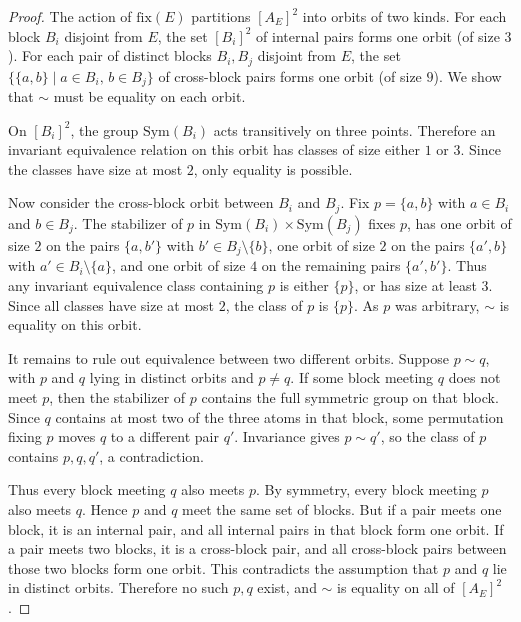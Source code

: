 \documentclass[10pt,a4paper]{amsart}
\theoremstyle{definition}
\begin{document}
\begin{proof}
The action of \(\mathrm{fix}(E)\) partitions \([A_E]^2\) into orbits of two kinds.  For each block \(B_i\) disjoint from \(E\), the set \([B_i]^2\) of internal pairs forms one orbit (of size \(3\)).  For each pair of distinct blocks \(B_i,B_j\) disjoint from \(E\), the set \(\{\{a,b\}\mid a\in B_i,\, b\in B_j\}\) of cross-block pairs forms one orbit (of size \(9\)).  We show that \(\sim\) must be equality on each orbit.

On \([B_i]^2\), the group \(\mathrm{Sym}(B_i)\) acts transitively on three points.  Therefore an invariant equivalence relation on this orbit has classes of size either \(1\) or \(3\).  Since the classes have size at most \(2\), only equality is possible.

Now consider the cross-block orbit between \(B_i\) and \(B_j\).  Fix \(p=\{a,b\}\) with \(a\in B_i\) and \(b\in B_j\).  The stabilizer of \(p\) in \(\mathrm{Sym}(B_i)\times \mathrm{Sym}(B_j)\) fixes \(p\), has one orbit of size \(2\) on the pairs \(\{a,b'\}\) with \(b'\in B_j\setminus\{b\}\), one orbit of size \(2\) on the pairs \(\{a',b\}\) with \(a'\in B_i\setminus\{a\}\), and one orbit of size \(4\) on the remaining pairs \(\{a',b'\}\).  Thus any invariant equivalence class containing \(p\) is either \(\{p\}\), or has size at least \(3\).  Since all classes have size at most \(2\), the class of \(p\) is \(\{p\}\).  As \(p\) was arbitrary, \(\sim\) is equality on this orbit.

It remains to rule out equivalence between two different orbits.  Suppose \(p\sim q\), with \(p\) and \(q\) lying in distinct orbits and \(p\neq q\).  If some block meeting \(q\) does not meet \(p\), then the stabilizer of \(p\) contains the full symmetric group on that block.  Since \(q\) contains at most two of the three atoms in that block, some permutation fixing \(p\) moves \(q\) to a different pair \(q'\).  Invariance gives \(p\sim q'\), so the class of \(p\) contains \(p,q,q'\), a contradiction.

Thus every block meeting \(q\) also meets \(p\).  By symmetry, every block meeting \(p\) also meets \(q\).  Hence \(p\) and \(q\) meet the same set of blocks.  But if a pair meets one block, it is an internal pair, and all internal pairs in that block form one orbit.  If a pair meets two blocks, it is a cross-block pair, and all cross-block pairs between those two blocks form one orbit.  This contradicts the assumption that \(p\) and \(q\) lie in distinct orbits.  Therefore no such \(p,q\) exist, and \(\sim\) is equality on all of \([A_E]^2\).
\end{proof}
\end{document}
